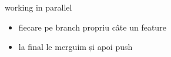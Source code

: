 \documentclass{beamer}
\begin{document}
\begin{frame}{working in parallel}
  \begin{itemize}
    \item fiecare pe branch propriu câte un feature
    \item la final le merguim și apoi push
  \end{itemize}
\end{frame}
\end{document}
